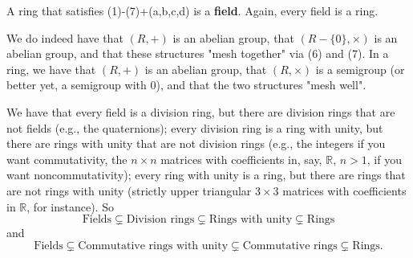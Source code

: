 \documentclass[12pt]{article}
\begin{document}
A ring that satisfies (1)-(7)+(a,b,c,d) is a \textbf{field}.  Again, every field is a ring.

We do indeed have that $(R,+)$ is an abelian group, that $(R-\{0\},\times)$ is an abelian group, and that these structures "mesh together" via (6) and (7). In a ring, we have that $(R,+)$ is an abelian group, that $(R,\times)$ is a semigroup (or better yet, a semigroup with $0$), and that the two structures "mesh well".

We have that every field is a division ring, but there are division rings that are not fields (e.g., the quaternions); every division ring is a ring with unity, but there are rings with unity that are not division rings (e.g., the integers if you want commutativity, the $n\times n$ matrices with coefficients in, say, $\mathbb{R}$, $n > 1$, if you want noncommutativity); every ring with unity is a ring, but there are rings that are not rings with unity (strictly upper triangular $3\times 3$ matrices with coefficients in $\mathbb{R}$, for instance). So
$$\text{Fields}\subsetneq \text{Division rings}\subsetneq \text{Rings with unity} \subsetneq \text{Rings}$$
and
$$\text{Fields}\subsetneq \text{Commutative rings with unity}\subsetneq \text{Commutative rings}\subsetneq \text{Rings}.$$

\nocite{*}
\printbibliography
\end{document}
